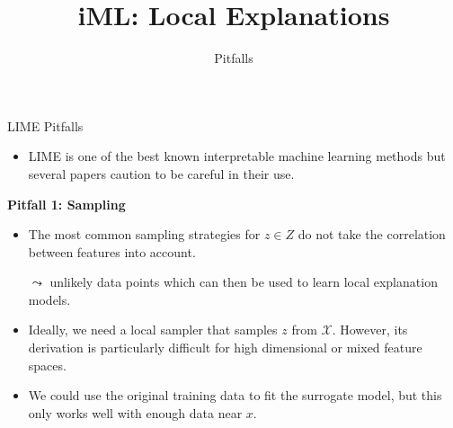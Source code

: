 \documentclass[aspectratio=169]{../latex_main/tntbeamer}  %
\title[Introduction]{iML: Local Explanations}
\subtitle{Pitfalls}
\begin{document}
	
	\maketitle

\begin{frame}{LIME Pitfalls }
  \begin{itemize}
  	\item LIME is one of the best known interpretable machine learning methods but several papers caution to be careful in their use. 
  \end{itemize}
	\textbf{Pitfall 1: Sampling}
	\begin{itemize}
	  \item The most common sampling strategies for $z \in Z$ do not take the correlation between features into account. 
      \item[$\leadsto$] unlikely data points which can then be used to learn local explanation models.
      \item Ideally, we need a local sampler that samples $z$ from $\mathcal{X}$. However, its derivation is particularly difficult for high dimensional or mixed feature spaces. 
      \item We could use the original training data to fit the surrogate model, but this only works well with enough data near $x$.
    \end{itemize}
\end{frame}
\end{document}
